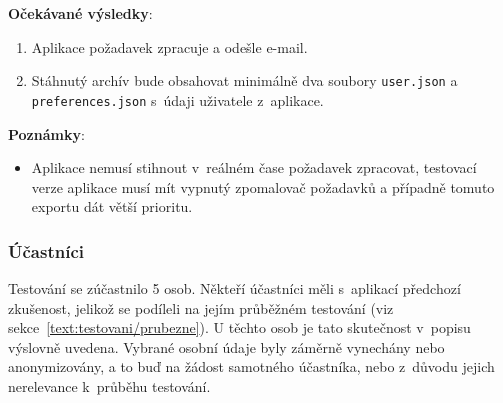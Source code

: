 \textbf{Očekávané výsledky}:

\begin{enumerate}[leftmargin=1.4cm]
    \item Aplikace požadavek zpracuje a odešle e-mail.
    \item Stáhnutý archív bude obsahovat minimálně dva soubory  \verb|user.json| a \verb|preferences.json| s~údaji uživatele z~aplikace.
\end{enumerate}

\textbf{Poznámky}:

\begin{itemize}[leftmargin=1.4cm]
    \item Aplikace nemusí stihnout v~reálném čase požadavek zpracovat, testovací verze aplikace musí mít vypnutý zpomalovač požadavků a případně tomuto exportu dát větší prioritu.
\end{itemize}



\subsubsection{Účastníci}

Testování se zúčastnilo 5 osob. 
Někteří účastníci měli s~aplikací předchozí zkušenost, jelikož se podíleli na jejím průběžném testování (viz sekce~\ref{text:testovani/prubezne}). 
U těchto osob je tato skutečnost v~popisu výslovně uvedena. 
Vybrané osobní údaje byly záměrně vynechány nebo anonymizovány, a to buď na žádost samotného účastníka, nebo z~důvodu jejich nerelevance k~průběhu testování.

